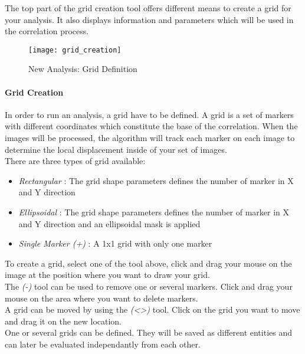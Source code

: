 \indent\indent The top part of the grid creation tool offers different means to create a grid for your analysis. It also displays information and parameters which will be used in the correlation process.

\begin{figure}[!h]
   \centering
   \texttt{[image: grid\_creation]}
   \caption{New Analysis: Grid Definition}
\end{figure}

\paragraph{Grid Creation\\\newline}
\label{par:Grid Creation}
\indent In order to run an analysis, a grid have to be defined. A grid is a set of markers with different coordinates which constitute the base of the correlation. When the images will be processed, the algorithm will track each marker on each image to determine the local displacement inside of your set of images.\\
\newline
There are three types of grid available:
\begin{itemize}
  \item \textit{Rectangular} : The grid shape parameters defines the number of marker in X and Y direction
  \item \textit{Ellipsoidal} : The grid shape parameters defines the number of marker in X and Y direction and an ellipsoidal mask is applied
  \item \textit{Single Marker (+)} : A 1x1 grid with only one marker
\end{itemize}
\newline
\indent\indent To create a grid, select one of the tool above, click and drag your mouse on the image at the position where you want to draw your grid.\\
\newline
\indent The \textit{(-)} tool can be used to remove one or several markers. Click and drag your mouse on the area where you want to delete markers.\\
\newline
\indent A grid can be moved by using the \textit{(\textless\textgreater)} tool. Click on the grid you want to move and drag it on the new location.\\
\newline\newline
\indent One or several grids can be defined. They will be saved as different entities and can later be evaluated independantly from each other.

